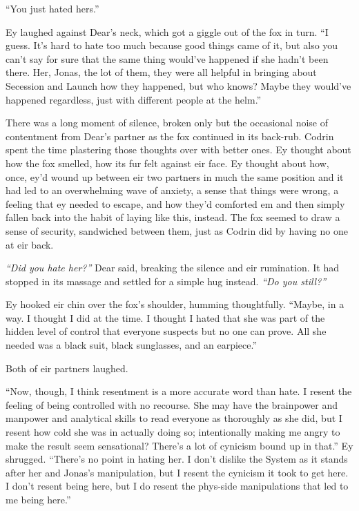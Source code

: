 ``You just hated hers.''

Ey laughed against Dear's neck, which got a giggle out of the fox in turn. ``I guess. It's hard to hate too much because good things came of it, but also you can't say for sure that the same thing would've happened if she hadn't been there. Her, Jonas, the lot of them, they were all helpful in bringing about Secession and Launch how they happened, but who knows? Maybe they would've happened regardless, just with different people at the helm.''

There was a long moment of silence, broken only but the occasional noise of contentment from Dear's partner as the fox continued in its back-rub. Codrin spent the time plastering those thoughts over with better ones. Ey thought about how the fox smelled, how its fur felt against eir face. Ey thought about how, once, ey'd wound up between eir two partners in much the same position and it had led to an overwhelming wave of anxiety, a sense that things were wrong, a feeling that ey needed to escape, and how they'd comforted em and then simply fallen back into the habit of laying like this, instead. The fox seemed to draw a sense of security, sandwiched between them, just as Codrin did by having no one at eir back.

\emph{``Did you hate her?''} Dear said, breaking the silence and eir rumination. It had stopped in its massage and settled for a simple hug instead. \emph{``Do you still?''}

Ey hooked eir chin over the fox's shoulder, humming thoughtfully. ``Maybe, in a way. I thought I did at the time. I thought I hated that she was part of the hidden level of control that everyone suspects but no one can prove. All she needed was a black suit, black sunglasses, and an earpiece.''

Both of eir partners laughed.

``Now, though, I think resentment is a more accurate word than hate. I resent the feeling of being controlled with no recourse. She may have the brainpower and manpower and analytical skills to read everyone as thoroughly as she did, but I resent how cold she was in actually doing so; intentionally making me angry to make the result seem sensational? There's a lot of cynicism bound up in that.'' Ey shrugged. ``There's no point in hating her. I don't dislike the System as it stands after her and Jonas's manipulation, but I resent the cynicism it took to get here. I don't resent being here, but I do resent the phys-side manipulations that led to me being here.''

